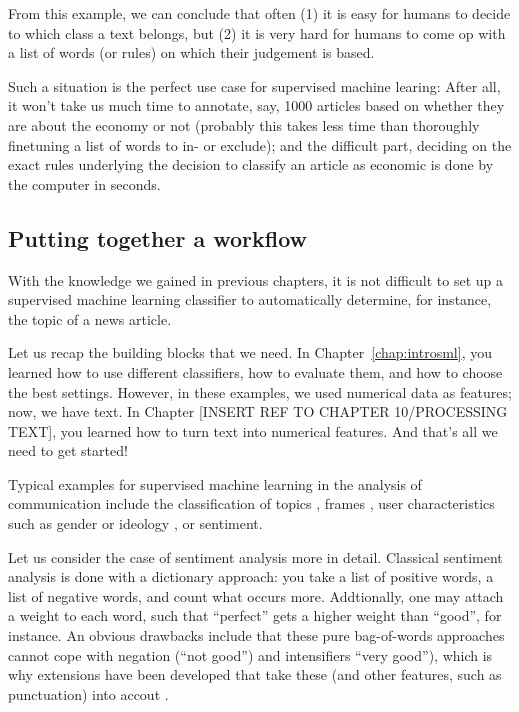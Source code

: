 From this example, we can conclude that often (1) it is easy for
humans to decide to which class a text belongs, but (2) it is very
hard for humans to come op with a list of words (or rules) on which
their judgement is based.

Such a situation is the perfect use case for supervised machine
learing: After all, it won't take us much time to annotate, say, 1000
articles based on whether they are about the economy or not (probably
this takes less time than thoroughly finetuning a list of words to in-
or exclude); and the difficult part, deciding on the exact rules
underlying the decision to classify an article as economic is done by
the computer in seconds.


\subsection{Putting together a workflow}
With the knowledge we gained in previous chapters, it is not difficult
to set up a supervised machine learning classifier to automatically
determine, for instance, the topic of a news article.

Let us recap the building blocks that we need. In
Chapter~\ref{chap:introsml}, you learned how to use different
classifiers, how to evaluate them, and how to choose the best
settings. However, in these examples, we used numerical data as
features; now, we have text.  In Chapter [INSERT REF TO CHAPTER
  10/PROCESSING TEXT], you learned how to turn text into numerical
features. And that's all we need to get started!

Typical examples for supervised machine learning in the analysis of
communication include the classification of topics
\citep[e.g.,][]{Scharkow2011}, frames \citep[e.g.,][]{Burscher2014},
user characteristics such as gender or ideology ,
or sentiment.

Let us consider the case of sentiment analysis more in
detail. Classical sentiment analysis is done with a dictionary
approach: you take a list of positive words, a list of negative words,
and count what occurs more. Addtionally, one may attach a weight to
each word, such that ``perfect'' gets a higher weight than ``good'',
for instance.  An obvious drawbacks include that these pure
bag-of-words approaches cannot cope with negation (``not good'') and
intensifiers ``very good''), which is why extensions have been
developed that take these (and other features, such as punctuation)
into accout \citep{Thelwall2012,Hutto2014,DeSmedt2012}.

